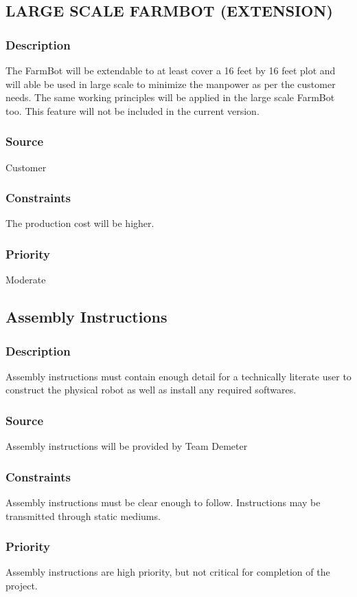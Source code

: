 \subsection{LARGE SCALE FARMBOT (EXTENSION)}
\subsubsection{Description}
The FarmBot will be extendable to at least cover a 16 feet by 16 feet plot and will able be used in large scale to minimize the manpower as per the customer needs. The same working principles will be applied in the large scale FarmBot too. This feature will not be included in the current version.
\subsubsection{Source}
Customer
\subsubsection{Constraints}
The production cost will be higher.
\subsubsection{Priority}
Moderate

\subsection{Assembly Instructions}
\subsubsection{Description}
Assembly instructions must contain enough detail for a technically literate user to construct the physical robot as well as install any required softwares.
\subsubsection{Source}
Assembly instructions will be provided by Team Demeter
\subsubsection{Constraints}
Assembly instructions must be clear enough to follow. Instructions may be transmitted through static mediums.
\subsubsection{Priority}
Assembly instructions are high priority, but not critical for completion of the project.

